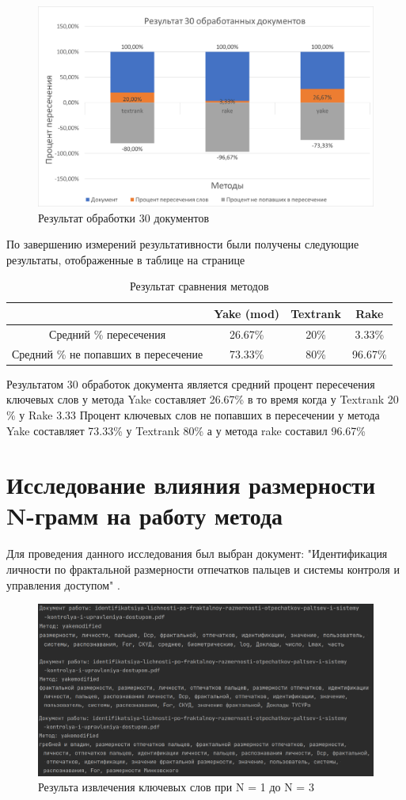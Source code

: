 \begin{figure}
	\centering
	\includegraphics[width=0.7\linewidth]{src/img/experiment/experiment_1_4}
	\caption{Результат обработки 30 документов}
	\label{fig:experiment14}
\end{figure}

По завершению измерений результативности были получены следующие результаты, отображенные в таблице на странице \pageref{table:experiment31}
\begin{table}[!h]
	\begin{tabular}{|c|c|c|c|}
		\hline
		& Yake (mod) & Textrank & Rake \\
		\hline
		Средний \% пересечения & 26.67\% & 20\% & 3.33\% \\
		\hline
		Средний \% не попавших в пересечение & 73.33\% & 80\% & 96.67\% \\
	\end{tabular}
	\label{table:experiment31}
	\caption{Результат сравнения методов}
\end{table}
Результатом 30 обработок документа является средний процент пересечения ключевых слов у метода Yake составляет 26.67\% в то время когда у Textrank 20 \% у Rake 3.33%
Процент ключевых слов не попавших в пересечении у метода Yake составляет 73.33\% у Textrank 80\% а у метода rake составил 96.67\%

\section{Исследование влияния размерности N-грамм на работу метода}
Для проведения данного исследования был выбран документ: "Идентификация личности по фрактальной размерности отпечатков пальцев и системы контроля и управления доступом" \cite{}.

\begin{figure}[!h]
	\centering
	\includegraphics[width=0.7\linewidth]{src/img/experiment/experiment_2_1}
	\caption{Результа извлечения ключевых слов при N = 1 до N = 3}
	\label{fig:experiment21}
\end{figure}

